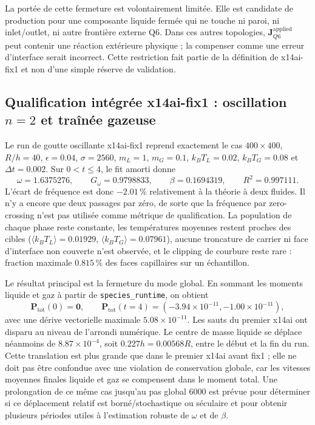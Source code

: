 \documentclass[11pt,a4paper]{article}
\begin{document}
La portée de cette fermeture est volontairement limitée. Elle est candidate de production pour une composante liquide fermée qui ne touche ni paroi, ni inlet/outlet, ni autre frontière externe Q6. Dans ces autres topologies, $\bm J_{Q6}^{\mathrm{applied}}$ peut contenir une réaction extérieure physique ; la compenser comme une erreur d'interface serait incorrect. Cette restriction fait partie de la définition de x14ai-fix1 et non d'une simple réserve de validation.

\subsection{Qualification intégrée x14ai-fix1 : oscillation $n=2$ et traînée gazeuse}

Le run de goutte oscillante x14ai-fix1 reprend exactement le cas $400\times400$, $R/h=40$, $\epsilon=0.04$, $\sigma=2560$, $m_L=1$, $m_G=0.1$, $k_BT_L=0.02$, $k_BT_G=0.08$ et $\Delta t=0.002$. Sur $0<t\le4$, le fit amorti donne
\begin{equation}
  \omega=1.6375276,
  \qquad G_\omega=0.9798833,
  \qquad \beta=0.1694319,
  \qquad R^2=0.997111.
\end{equation}
L'écart de fréquence est donc $-2.01\,\%$ relativement à la théorie à deux fluides. Il n'y a encore que deux passages par zéro, de sorte que la fréquence par zero-crossing n'est pas utilisée comme métrique de qualification. La population de chaque phase reste constante, les températures moyennes restent proches des cibles ($\langle k_BT_L\rangle=0.01929$, $\langle k_BT_G\rangle=0.07961$), aucune troncature de carrier ni face d'interface non couverte n'est observée, et le clipping de courbure reste rare : fraction maximale $0.815\,\%$ des faces capillaires sur un échantillon.

Le résultat principal est la fermeture du mode global. En sommant les moments liquide et gaz à partir de \texttt{species\_runtime}, on obtient
\begin{equation}
  \bm P_{\mathrm{tot}}(0)=\bm 0,
  \qquad
  \bm P_{\mathrm{tot}}(t=4)
  =(-3.94\times10^{-11},-1.00\times10^{-11}),
\end{equation}
avec une dérive vectorielle maximale $5.08\times10^{-11}$. Les sauts du premier x14ai ont disparu au niveau de l'arrondi numérique. Le centre de masse liquide se déplace néanmoins de $8.87\times10^{-4}$, soit $0.227h=0.00568R$, entre le début et la fin du run. Cette translation est plus grande que dans le premier x14ai avant fix1 ; elle ne doit pas être confondue avec une violation de conservation globale, car les vitesses moyennes finales liquide et gaz se compensent dans le moment total. Une prolongation de ce même cas jusqu'au pas global 6000 est prévue pour déterminer si ce déplacement relatif est borné/stochastique ou séculaire et pour obtenir plusieurs périodes utiles à l'estimation robuste de $\omega$ et de $\beta$.
\end{document}
